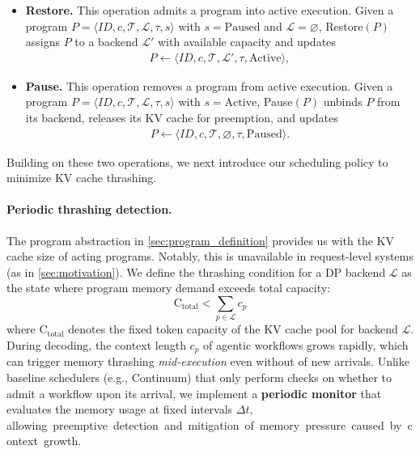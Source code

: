 \begin{itemize}[itemsep=0.0pt,topsep=0pt,leftmargin=*]
    \item \textbf{Restore.} This operation admits a program into active execution. Given a program $P = \langle \mathit{ID}, c, \mathcal{T}, \mathcal{L}, \tau, s \rangle$ with $s = \text{Paused}$ and $\mathcal{L} = \varnothing$,
  Restore$(P)$ assigns $P$ to a backend $\mathcal{L}'$ with available capacity and updates
  \begin{align}
  P \leftarrow \langle \mathit{ID}, c, \mathcal{T}, \mathcal{L}', \tau, \text{Active} \rangle,
  \end{align}
    \item \textbf{Pause.} This operation removes a program from active execution.
Given a program $P = \langle \mathit{ID}, c, \mathcal{T}, \mathcal{L}, \tau, s \rangle$
with $s = \text{Active}$,
Pause$(P)$ unbinds $P$ from its backend, releases its KV cache for preemption, and updates
\begin{align}
P \leftarrow \langle \mathit{ID}, c, \mathcal{T}, \varnothing, \tau, \text{Paused} \rangle .
\end{align}
\end{itemize}

\noindent Building on these two operations, we next introduce our scheduling policy to minimize KV cache thrashing.

\paragraph{Periodic thrashing detection.}  The program abstraction in \autoref{sec:program_definition} provides us with the KV cache size of acting programs. Notably, this is unavailable in request-level systems (as in \autoref{sec:motivation}). We define the thrashing condition for a DP backend $\mathcal{L}$ as the state where program memory demand exceeds total capacity:
\begin{equation}
    \text{C}_{\text{total}} < \sum_{p \in \mathcal{L}} c_p
\end{equation}
\noindent where $\text{C}_{\text{total}}$ denotes the fixed token capacity of the KV cache pool for backend $\mathcal{L}$. During decoding, the context length $c_p$ of agentic workflows grows rapidly, which can trigger memory thrashing \emph{mid-execution} even without of new arrivals. Unlike baseline schedulers (e.g., Continuum) that only perform checks on whether to admit a workflow upon its arrival, we implement a \textbf{periodic monitor} that evaluates the memory usage at fixed intervals $\Delta t$, \mbox{allowing preemptive detection and mitigation of memory pressure caused by context growth.}

